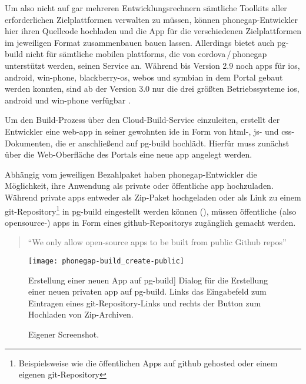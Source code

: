{Um also nicht auf gar mehreren Entwicklungsrechnern sämtliche Toolkits aller erforderlichen Zielplattformen verwalten zu müssen, können \gls{phonegap}-Entwickler hier ihren Quellcode hochladen und die App für die verschiedenen Zielplattformen im jeweiligen Format zusammenbauen bauen lassen.
Allerdings bietet auch \gls{pg-build} nicht für sämtliche mobilen \glspl{plattform}, die von \gls{cordova}\,/\,\gls{phonegap} unterstützt werden, seinen Service an.
Während bis Version 2.9 noch \glspl{app} für \gls{ios}, \gls{android}, \gls{win-phone}, \gls{blackberry-os}, \gls{webos} und \gls{symbian} in dem Portal gebaut werden konnten,
sind ab der Version 3.0 nur die drei größten Betriebssysteme \gls{ios}, \gls{android} und \gls{win-phone} verfügbar \cite{PhoneGap_Build_Documentation_Supported-Platforms}. 

Um den Build-Prozess über den Cloud-Build-Service einzuleiten, erstellt der Entwickler eine \gls{web-app} in seiner gewohnten \gls{ide} in Form von \gls{html}-, \gls{js}- und \gls{css}-Dokumenten, die er anschließend auf \gls{pg-build} hochlädt.
Hierfür muss zunächst über die Web-Oberfläche des Portals eine neue \gls{app} angelegt werden.

Abhängig vom jeweiligen Bezahlpaket haben \gls{phonegap}-Entwickler die Möglichkeit, ihre Anwendung als private oder öffentliche \gls{app} hochzuladen. 
Während private \glspl{app} entweder als Zip-Paket hochgeladen oder als Link zu einem \gls{git}-Repository\footnote{Beispielsweise wie die öffentlichen Apps auf \gls{github} gehosted oder einem eigenen \gls{git}-Repository} in \gls{pg-build} eingestellt werden können (), müssen öffentliche (also \gls{opensource}-) \glspl{app} in Form eines \gls{github}-Repositorys zugänglich gemacht werden.

\begin{quote}
\enquote{We only allow open-source apps to be built from public Github repos} \cite{PhoneGap_Build_Apps}
\end{quote}


\begin{figure}[h!]
\centering
\texttt{[image: phonegap-build\_create-public]}
	\caption
		[Erstellung einer neuen App auf \gls{pg-build}]
		{Dialog für die Erstellung einer neuen privaten \gls{app} auf \gls{pg-build}. Links das Eingabefeld zum Eintragen eines \gls{git}-Repository-Links und rechts der Button zum Hochladen von Zip-Archiven.}
		\label{fig:phonegap-build_create-public}
	\imagesourcefont
	\vspace{\imagesourcespace}
	\imagesourcefont{}
	\caption*{\imagesourcelabel Eigener Screenshot.}
\end{figure}


}
